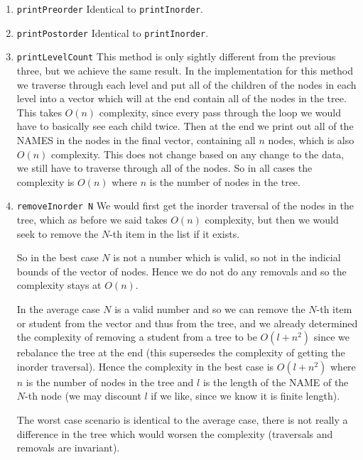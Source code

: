 \documentclass[11pt]{article}
\begin{document}
\begin{enumerate}
  \item \texttt{printPreorder} Identical to \texttt{printInorder}.
  
  \item \texttt{printPostorder} Identical to \texttt{printInorder}.
  
  \item \texttt{printLevelCount} This method is only sightly different from the previous three, but we achieve the same result. In the implementation for this method we traverse through each level and put all of the children of the nodes in each level into a vector which will at the end contain all of the nodes in the tree. This takes $O(n)$ complexity, since every pass through the loop we would have to basically see each child twice. Then at the end we print out all of the NAMES in the nodes in the final vector, containing all $n$ nodes, which is also $O(n)$ complexity. This does not change based on any change to the data, we still have to traverse through all of the nodes. So in all cases the complexity is $O(n)$ where $n$ is the number of nodes in the tree.
  
  \item \texttt{removeInorder N} We would first get the inorder traversal of the nodes in the tree, which as before we said takes $O(n)$ complexity, but then we would seek to remove the $N$-th item in the list if it exists.
  
  So in the best case $N$ is not a number which is valid, so not in the indicial bounds of the vector of nodes. Hence we do not do any removals and so the complexity stays at $O(n)$.

  In the average case $N$ is a valid number and so we can remove the $N$-th item or student from the vector and thus from the tree, and we already determined the complexity of removing a student from a tree to be $O(l+n^2)$ since we rebalance the tree at the end (this supersedes the complexity of getting the inorder traversal). Hence the complexity in the best case is $O(l+n^2)$ where $n$ is the number of nodes in the tree and $l$ is the length of the NAME of the $N$-th node (we may discount $l$ if we like, since we know it is finite length).

  The worst case scenario is identical to the average case, there is not really a difference in the tree which would worsen the complexity (traversals and removals are invariant).
  
\end{enumerate}
\end{document}
